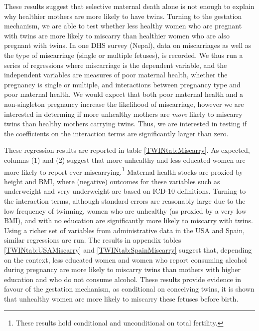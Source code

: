 \documentclass[subeqn]{article}
\begin{document}
\begin{spacing}{1.4}
These results suggest that selective maternal death alone is not enough to 
explain why healthier mothers are more likely to have twins. Turning to the 
gestation mechanism, we are able to test whether less healthy women who are 
pregnant with twins are more likely to miscarry than healthier women who are 
also pregnant with twins.  In one DHS survey (Nepal), data on miscarriages as 
well as the type of miscarriage (single or multiple fetuses), is recorded. We 
thus run a series of regressions where miscarriage is the dependent variable, 
and the independent variables are measures of poor maternal health, whether 
the pregnancy is single or multiple, and interactions between pregnancy type 
and poor maternal health.  We would expect that both poor maternal health and 
a non-singleton pregnancy increase the likelihood of miscarriage, however we 
are interested in determing if more unhealthy mothers are \emph{more} likely to 
miscarry twins than healthy mothers carrying twins.  Thus, we are interested in 
testing if the coefficients on the interaction terms are significantly larger 
than zero.

These regression results are reported in table \ref{TWINtab:Miscarry}.  As 
expected, columns (1) and (2) suggest that more unhealthy and less educated
women are more likely to report ever miscarrying.\footnote{These results hold 
conditional and unconditional on total fertility.}  Maternal health stocks are 
proxied by height and BMI, where (negative) outcomes for these variables such as 
underweight and very underweight are based on ICD-10 definitions. Turning to the 
interaction terms, although standard errors are reasonably large due to the low 
frequency of twinning, women who are unhealthy (as proxied by a very low BMI), 
and with no education are significantly more likely to miscarry with twins.  
Using a richer set of variables from administrative data in the USA and Spain, 
similar regressions are run.  The results in appendix tables 
\ref{TWINtab:USAMiscarry} and \ref{TWINtab:SpainMiscarry} suggest that, 
depending on the context, less educated women and women who report consuming 
alcohol during pregnancy are more likely to miscarry twins than mothers with 
higher education and who do not consume alcohol. These results provide evidence
in favour of the gestation mechanism, as conditional on conceiving twins, it is
shown that unhealthy women are more likely to miscarry these fetuses before 
birth.


\end{spacing}
\end{document}
